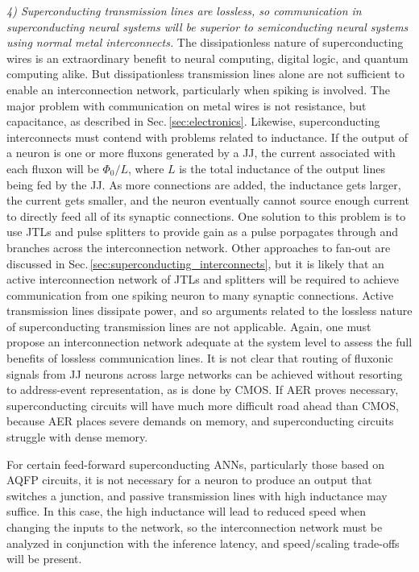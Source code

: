 \documentclass[twocolumn]{article}
\begin{document}
\vspace{1em}
\textit{4) Superconducting transmission lines are lossless, so communication in superconducting neural systems will be superior to semiconducting neural systems using normal metal interconnects.} \newline The dissipationless nature of superconducting wires is an extraordinary benefit to neural computing, digital logic, and quantum computing alike. But dissipationless transmission lines alone are not sufficient to enable an interconnection network, particularly when spiking is involved. The major problem with communication on metal wires is not resistance, but capacitance, as described in Sec.\,\ref{sec:electronics}. Likewise, superconducting interconnects must contend with problems related to inductance. If the output of a neuron is one or more fluxons generated by a JJ, the current associated with each fluxon will be $\Phi_0/L$, where $L$ is the total inductance of the output lines being fed by the JJ. As more connections are added, the inductance gets larger, the current gets smaller, and the neuron eventually cannot source enough current to directly feed all of its synaptic connections. One solution to this problem is to use JTLs and pulse splitters to provide gain as a pulse porpagates through and branches across the interconnection network. Other approaches to fan-out are discussed in Sec.\,\ref{sec:superconducting_interconnects}, but it is likely that an active interconnection network of JTLs and splitters will be required to achieve communication from one spiking neuron to many synaptic connections. Active transmission lines dissipate power, and so arguments related to the lossless nature of superconducting transmission lines are not applicable. Again, one must propose an interconnection network adequate at the system level to assess the full benefits of lossless communication lines. It is not clear that routing of fluxonic signals from JJ neurons across large networks can be achieved without resorting to address-event representation, as is done by CMOS. If AER proves necessary, superconducting circuits will have much more difficult road ahead than CMOS, because AER places severe demands on memory, and superconducting circuits struggle with dense memory.

For certain feed-forward superconducting ANNs, particularly those based on AQFP circuits, it is not necessary for a neuron to produce an output that switches a junction, and passive transmission lines with high inductance may suffice. In this case, the high inductance will lead to reduced speed when changing the inputs to the network, so the interconnection network must be analyzed in conjunction with the inference latency, and speed/scaling trade-offs will be present.
\end{document}
